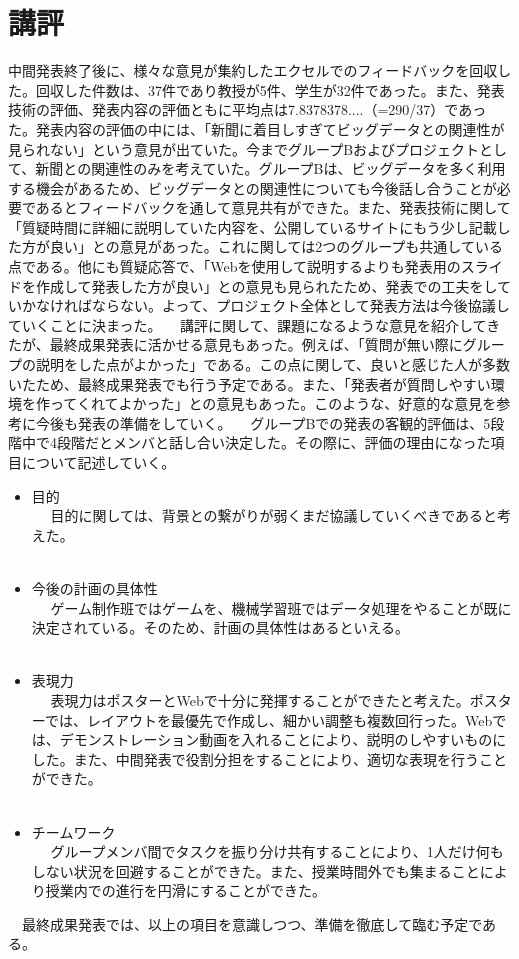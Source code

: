 \section{講評}
中間発表終了後に、様々な意見が集約したエクセルでのフィードバックを回収した。回収した件数は、37件であり教授が5件、学生が32件であった。また、発表技術の評価、発表内容の評価ともに平均点は7.8378378....（=290/37）であった。発表内容の評価の中には、「新聞に着目しすぎてビッグデータとの関連性が見られない」という意見が出ていた。今までグループBおよびプロジェクトとして、新聞との関連性のみを考えていた。グループBは、ビッグデータを多く利用する機会があるため、ビッグデータとの関連性についても今後話し合うことが必要であるとフィードバックを通して意見共有ができた。また、発表技術に関して「質疑時間に詳細に説明していた内容を、公開しているサイトにもう少し記載した方が良い」との意見があった。これに関しては2つのグループも共通している点である。他にも質疑応答で、「Webを使用して説明するよりも発表用のスライドを作成して発表した方が良い」との意見も見られたため、発表での工夫をしていかなければならない。よって、プロジェクト全体として発表方法は今後協議していくことに決まった。
　講評に関して、課題になるような意見を紹介してきたが、最終成果発表に活かせる意見もあった。例えば、「質問が無い際にグループの説明をした点がよかった」である。この点に関して、良いと感じた人が多数いたため、最終成果発表でも行う予定である。また、「発表者が質問しやすい環境を作ってくれてよかった」との意見もあった。このような、好意的な意見を参考に今後も発表の準備をしていく。
　グループBでの発表の客観的評価は、5段階中で4段階だとメンバと話し合い決定した。その際に、評価の理由になった項目について記述していく。
\begin{itemize}
    \item 目的\\
　  目的に関しては、背景との繋がりが弱くまだ協議していくべきであると考えた。\\
　  \item 今後の計画の具体性\\
　  ゲーム制作班ではゲームを、機械学習班ではデータ処理をやることが既に決定されている。そのため、計画の具体性はあるといえる。\\
　  \item 表現力\\
　  表現力はポスターとWebで十分に発揮することができたと考えた。ポスターでは、レイアウトを最優先で作成し、細かい調整も複数回行った。Webでは、デモンストレーション動画を入れることにより、説明のしやすいものにした。また、中間発表で役割分担をすることにより、適切な表現を行うことができた。\\
　  \item チームワーク\\
　  グループメンバ間でタスクを振り分け共有することにより、1人だけ何もしない状況を回避することができた。また、授業時間外でも集まることにより授業内での進行を円滑にすることができた。\\
\end{itemize}
　最終成果発表では、以上の項目を意識しつつ、準備を徹底して臨む予定である。

